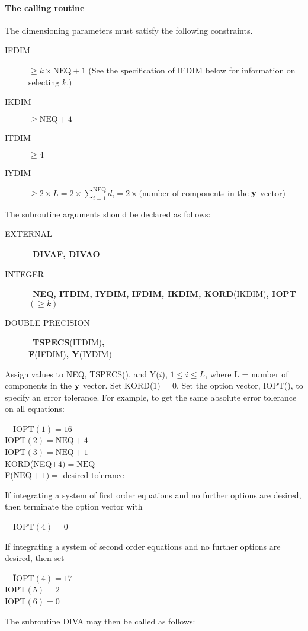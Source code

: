 \documentclass[twoside]{MATH77}
\begin{document}
\paragraph{The calling routine\label{Calling}}

The dimensioning parameters must satisfy the following constraints.
\begin{description}
\item[IFDIM]  $\geq k\times \text{NEQ}+1$ (See the specification of
IFDIM below for information on selecting $k.)$
\item[IKDIM]  $\geq \text{NEQ}+4$
\item[ITDIM]  $\geq 4$
\item[IYDIM]  $\geq 2\times L=2\times \sum_{i=1}^{\text{NEQ}}d_i=2\times
($number of components in the ${\bf y}$ vector)
\end{description}
The subroutine arguments should be declared as follows:
\begin{description}
\item[EXTERNAL]  \ {\bf DIVAF, DIVAO}
\item[INTEGER]  \ {\bf NEQ, ITDIM, IYDIM, IFDIM, IKDIM, KORD}(IKDIM){\bf ,
IOPT}$(\geq k)$ 
\item[DOUBLE PRECISION] \ {\bf TSPECS}(ITDIM){\bf ,\\
F}(IFDIM){\bf , Y}(IYDIM)
\end{description}
Assign values to NEQ, TSPECS(), and Y($i$), $1\leq i\leq L$, where L
= number of components in the ${\bf y}$ vector. Set KORD(1) = 0.
Set the option vector, IOPT(), to specify an error tolerance. For example,
to get the same absolute error tolerance on all equations:
\vspace{-5pt}
\begin{tabbing}
\ \ \=IOPT$(1)=16$ \\
\>IOPT$(2)=\text{NEQ}+4$ \\
\>IOPT$(3)=\text{NEQ}+1$ \\
\>KORD(NEQ$+4)=\text{NEQ}$ \\
\>F($\text{NEQ}+1)=$ desired tolerance
\end{tabbing}
\vspace{-5pt}
If integrating a system of first order equations and no further options are
desired, then terminate the option vector with
\vspace{-5pt}
\begin{tabbing}
\ \ IOPT$(4)=0$
\end{tabbing}
\vspace{-5pt}
If integrating a system of second order equations and no further options are
desired, then set
\vspace{-5pt}
\begin{tabbing}
\ \ \=IOPT$(4)=17$ \\
\>IOPT$(5)=2$  \\
\>IOPT$(6)=0$
\end{tabbing}
\vspace{-5pt}
The subroutine DIVA may then be called as follows:
\end{document}
